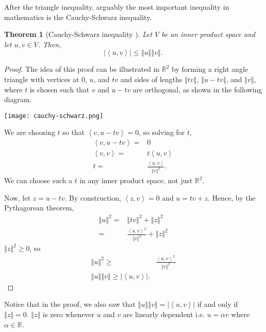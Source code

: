 \documentclass[12pt,reqno]{amsart}
\newtheorem{theorem}{Theorem}[section]
\theoremstyle{definition}
\def\R{\mathbb{R}}
\newcommand{\iprod}[2]{\left\langle {#1} , {#2} \right\rangle}
\newcommand{\norm}[1]{\left\Vert {#1} \right\Vert}
\begin{document}
After the triangle inequality, arguably the most important inequality
in mathematics is the Cauchy-Schwarz inequality. 
\begin{theorem}[Cauchy-Schwarz inequality \label{thm:cauchy-schwarz}]
  Let $V$ be an inner product space and let $u,v\in V$. Then,
  \[ \left\vert \iprod{u}{v} \right\vert \leq \norm{u}\norm{v}. \]
\end{theorem}
\begin{proof}
  The idea of this proof can be illustrated in $\R^2$ by forming a right
  angle triangle with vertices at $0$, $u$, and $tv$ and sides of
  lengths $\norm{tv}$, $\norm{u-tv}$, and $\norm{v}$, where $t$ is
  chosen such that $v$ and $u-tv$ are orthogonal, as shown in the
  following diagram.
  \begin{center}
    \texttt{[image: cauchy-schwarz.png]}
  \end{center}
  We are choosing $t$ so that $\iprod{v}{u-tv} = 0$, so solving for $t$,
  \begin{align*}
    \iprod{v}{u-tv} = & 0 \\
    \iprod{v}{v} = & t \iprod{u}{v} \\
    t = & \frac{\iprod{u}{v}}{\norm{v}^2}.
  \end{align*}
  We can choose such a $t$ in any inner product space, not just
  $\R^2$.
  
  Now, let $z = u-tv$. By construction, $\iprod{z}{v} = 0$ and $u = tv
  + z$. Hence, by the Pythagorean theorem,
  \begin{align*}
    \norm{u}^2 = & \norm{tv}^2 + \norm{z}^2 \\
    = & \frac{\iprod{u}{v}^2}{\norm{v}^2} + \norm{z}^2 
  \end{align*}
  $\norm{z}^2\geq 0$, so
  \begin{align*}
    \norm{u}^2 \geq & \frac{\iprod{u}{v}^2}{\norm{v}^2} \\
    \norm{u}\norm{v} \geq |\iprod{u}{v}|.
  \end{align*}
\end{proof}
Notice that in the proof, we also saw that  $\norm{u}\norm{v} =
|\iprod{u}{v}|$ if and only if $\norm{z} = 0$. $\norm{z}$ is zero
whenever $u$ and $v$ are linearly dependent i.e. $u = \alpha v$ where
$\alpha \in \R$. 
\end{document}
